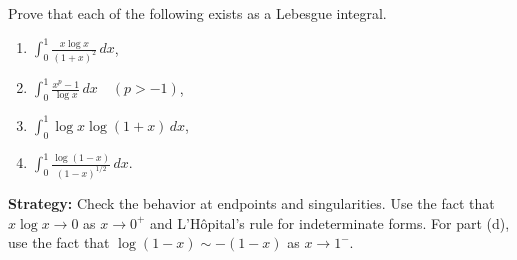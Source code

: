 \begin{problembox}
\begin{problemstatement}
Prove that each of the following exists as a Lebesgue integral.
\begin{enumerate}[label=(\alph*)]
\item $\int_{0}^{1} \frac{x \log x}{(1 + x)^2} \, dx$,
\item $\int_{0}^{1} \frac{x^p - 1}{\log x} \, dx \quad (p > -1)$,
\item $\int_{0}^{1} \log x \log (1 + x) \, dx$,
\item $\int_{0}^{1} \frac{\log (1 - x)}{(1 - x)^{1/2}} \, dx.$
\end{enumerate}
\end{problemstatement}
\end{problembox}

\noindent\textbf{Strategy:} Check the behavior at endpoints and singularities. Use the fact that $x \log x \to 0$ as $x \to 0^+$ and L'Hôpital's rule for indeterminate forms. For part (d), use the fact that $\log(1-x) \sim -(1-x)$ as $x \to 1^-$.

